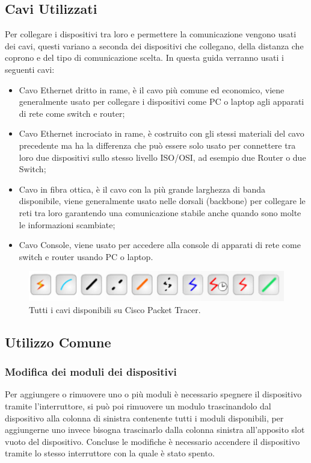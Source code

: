 \subsection{Cavi Utilizzati}
Per collegare i dispositivi tra loro e permettere la comunicazione vengono usati dei cavi, questi variano a seconda dei dispositivi che collegano, della distanza che coprono e del tipo di comunicazione scelta.\newline
\smallskip
\newline
In questa guida verranno usati i seguenti cavi:

\begin{itemize}
    \item Cavo Ethernet dritto in rame, è il cavo più comune ed economico, viene generalmente usato per collegare i dispositivi come PC o laptop agli apparati di rete come switch e router;
    \item Cavo Ethernet incrociato in rame, è costruito con gli stessi materiali del cavo precedente ma ha la differenza che può essere solo usato per connettere tra loro due dispositivi sullo stesso livello ISO/OSI, ad esempio due Router o due Switch;
    \item Cavo in fibra ottica, è il cavo con la più grande larghezza di banda disponibile, viene generalmente usato nelle dorsali (backbone) per collegare le reti tra loro garantendo una comunicazione stabile anche quando sono molte le informazioni scambiate;
    \item Cavo Console, viene usato per accedere alla console di apparati di rete come switch e router usando PC o laptop.
\end{itemize}

\begin{figure}[htbp]
    \centerline{\includegraphics[scale=.4]{images/02.packet-tracer/cavi.png}}
    \caption{Tutti i cavi disponibili su Cisco Packet Tracer.}
\end{figure}

\subsection{Utilizzo Comune}

\subsubsection{Modifica dei moduli dei dispositivi}
Per aggiungere o rimuovere uno o più moduli è necessario spegnere il dispositivo tramite l'interruttore, si può poi rimuovere un modulo trascinandolo dal dispositivo alla colonna di sinistra contenente tutti i moduli disponibili, per aggiungerne uno invece bisogna trascinarlo dalla colonna sinistra all'apposito slot vuoto del dispositivo. Concluse le modifiche è necessario accendere il dispositivo tramite lo stesso interruttore con la quale è stato spento.

